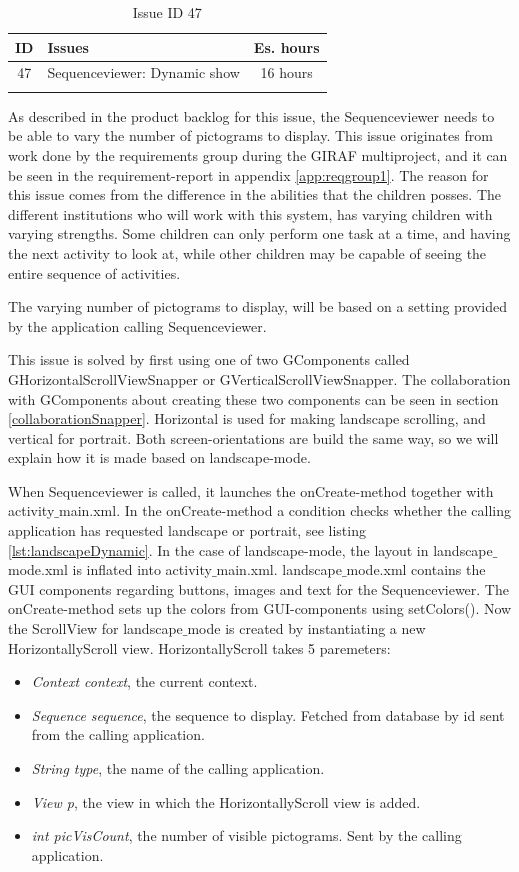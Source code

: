 \begin{longtable} { | c | p{12cm} | c | } 
\hline
	ID 	&	Issues	&		 Es. hours \\\hline
	 47	&	Sequenceviewer: Dynamic show	&	16 hours \\\hline
\caption{Issue ID 47}
\label{tab:spr3_SVdynamicshow}
\end{longtable}

As described in the product backlog for this issue, the Sequenceviewer needs to be able to vary the number of pictograms to display. This issue originates from work done by the requirements group during the GIRAF multiproject, and it can be seen in the requirement-report in appendix \ref{app:reqgroup1}. The reason for this issue comes from the difference in the abilities that the children posses. The different institutions who will work with this system, has varying children with varying strengths. Some children can only perform one task at a time, and having the next activity to look at, while other children may be capable of seeing the entire sequence of activities. 

The varying number of pictograms to display, will be based on a setting provided by the application calling Sequenceviewer.

This issue is solved by first using one of two GComponents called GHorizontalScrollViewSnapper or GVerticalScrollViewSnapper. The collaboration with GComponents about creating these two components can be seen in section \ref{collaborationSnapper}. Horizontal is used for making landscape scrolling, and vertical for portrait. Both screen-orientations are build the same way, so we will explain how it is made based on landscape-mode. 

When Sequenceviewer is called, it launches the onCreate-method together with activity$\_$main.xml. In the onCreate-method a condition checks whether the calling application has requested landscape or portrait, see listing \ref{lst:landscapeDynamic}. In the case of landscape-mode, the layout in landscape$\_$mode.xml is inflated into activity$\_$main.xml. landscape$\_$mode.xml contains the GUI components regarding buttons, images and text for the Sequenceviewer. The onCreate-method sets up the colors from GUI-components using setColors(). Now the ScrollView for landscape$\_$mode is created by instantiating a new HorizontallyScroll view. HorizontallyScroll takes 5 paremeters:
\begin{itemize}
\item \textit{Context context}, the current context.
\item \textit{Sequence sequence}, the sequence to display. Fetched from database by id sent from the calling application.
\item \textit{String type}, the name of the calling application.
\item \textit{View p}, the view in which the HorizontallyScroll view is added.
\item \textit{int picVisCount}, the number of visible pictograms. Sent by the calling application.
\end{itemize}

